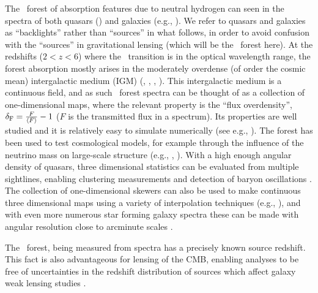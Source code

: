 The \lya\ forest of absorption features due to neutral hydrogen can
seen in the spectra of both quasars (\citealt{rauch1998}) and galaxies (e.g.,
\citealt{savaglio2002}).  We refer to quasars and galaxies as
``backlights'' rather than ``sources'' in what follows, in order to
avoid confusion with the ``sources'' in gravitational lensing (which
will be the \lya\ forest here). At the redshifts ($2 < z
< 6$) where the \lya\ transition is in the optical wavelength
range, the forest absorption mostly arises in the moderately overdense
(of order the cosmic mean) intergalactic medium (IGM) (\citealt{bi1993}, 
\citealt{cen1994}, \citealt{zhang1995}, \citealt{hernquist1996}).
  This intergalactic medium is a continuous field, and as such
\lya\ forest spectra can be thought of as a collection of
one-dimensional maps,
where the relevant property is the ``flux overdensity'', $\delta_{\rm F}=\frac{F}{\langle F \rangle} -1$ ($F$
is the transmitted flux in a spectrum).  Its properties are well
studied and it is relatively easy to simulate numerically (see e.g.,
\citealt{bolton2017}). The forest has been used to test
cosmological models, for example through the influence of the neutrino
mass on large-scale structure (e.g., \citealt{pal2015}, \citealt{croft1999}).
  With a high enough angular
density of quasars, three dimensional statistics can be evaluated
from  multiple sightlines, enabling clustering
measurements and detection of baryon
oscillations \citep{busca2013}. The
collection of one-dimensional skewers can also be used to make
continuous three dimensional maps using a variety of interpolation
techniques (e.g., \citealt{cisewski}), and
with even more numerous star forming galaxy spectra
these can be made with angular resolution close to arcminute scales
\citep{Lee2014}.

The \lya\ forest, being measured from spectra has a precisely known
source redshift. This fact is also advantageous for lensing of the
CMB, enabling analyses to be free of uncertainties in the redshift
distribution of sources which affect galaxy weak lensing studies
\citep{hearin2010}.

